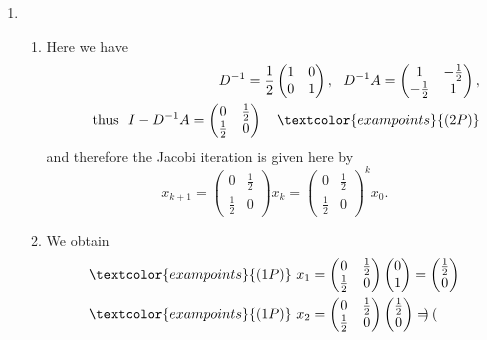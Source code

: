 {\begin{enumerate}
%
	\item
	\begin{enumerate}
		\item Here we have
		\begin{align*}
		D^{-1} = \frac{1}{2}\begin{pmatrix}
		1&0\\
		0&1
		\end{pmatrix},~~
		D^{-1}A = \begin{pmatrix}
		1&-\frac{1}{2}\\
		-\frac{1}{2}&1
		\end{pmatrix},\\~~~~~\text{thus}~~
		I - D^{-1}A = \begin{pmatrix}
		0&\frac{1}{2}\\
		\frac{1}{2}&0
		\end{pmatrix}~~~	\textcolor{exampoints}{(2P)}
		\end{align*}
			and therefore the Jacobi iteration is given here by
		$$
		x_{k+1} 
		= 
		\begin{pmatrix}
		0&\frac{1}{2}\\
		\frac{1}{2}&0
		\end{pmatrix} 
		x_k
		= 
		\begin{pmatrix}
		0&\frac{1}{2}\\
		\frac{1}{2}&0
		\end{pmatrix}^k
		x_0. 
		$$
		\item 	We obtain
		\begin{align*}
		\textcolor{exampoints}{(1P)}~	x_1 
		&= 	\begin{pmatrix}
		0&\frac{1}{2}\\
		\frac{1}{2}&0
		\end{pmatrix} 
		\begin{pmatrix}
		0\\
		1
		\end{pmatrix} 
		= 
		\begin{pmatrix}
		\frac{1}{2}\\
		0 
		\end{pmatrix} \\
		\textcolor{exampoints}{(1P)}~x_2
		&= 	\begin{pmatrix}
		0&\frac{1}{2}\\
		\frac{1}{2}&0
		\end{pmatrix} 
		\begin{pmatrix}
		\frac{1}{2}\\
		0
		\end{pmatrix} 
		= 
		\begin{pmatrix}

\end{pmatrix}
\end{align*}
\end{enumerate}
\end{enumerate}}
